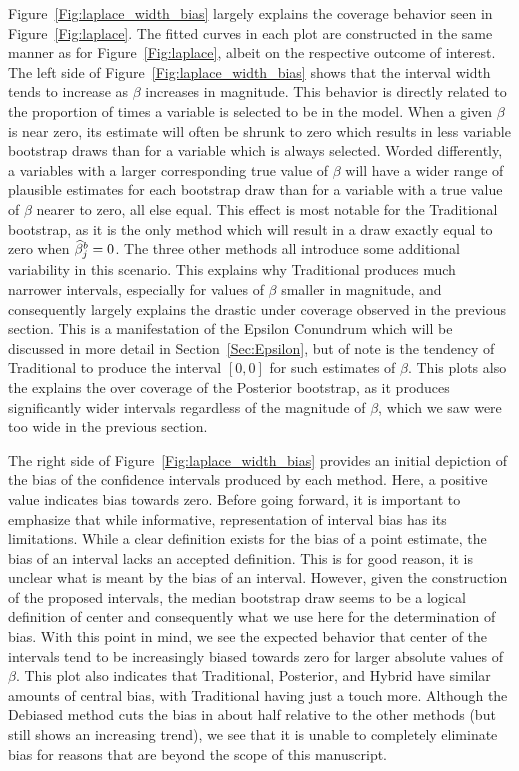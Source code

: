 Figure~\ref{Fig:laplace_width_bias} largely explains the coverage behavior seen in Figure~\ref{Fig:laplace}. The fitted curves in each plot are constructed in the same manner as for Figure~\ref{Fig:laplace}, albeit on the respective outcome of interest. The left side of Figure~\ref{Fig:laplace_width_bias} shows that the interval width tends to increase as $\beta$ increases in magnitude. This behavior is directly related to the proportion of times a variable is selected to be in the model. When a given $\beta$ is near zero, its estimate will often be shrunk to zero which results in less variable bootstrap draws than for a variable which is always selected. Worded differently, a variables with a larger corresponding true value of $\beta$ will have a wider range of plausible estimates for each bootstrap draw than for a variable with a true value of $\beta$ nearer to zero, all else equal. This effect is most notable for the Traditional bootstrap, as it is the only method which will result in a draw exactly equal to zero when $\widehat{\beta}^b_j = 0$. The three other methods all introduce some additional variability in this scenario. This explains why Traditional produces much narrower intervals, especially for values of $\beta$ smaller in magnitude, and consequently largely explains the drastic under coverage observed in the previous section. This is a manifestation of the Epsilon Conundrum which will be discussed in more detail in Section~\ref{Sec:Epsilon}, but of note is the tendency of Traditional to produce the interval $[0,0]$ for such estimates of $\beta$. This plots also the explains the over coverage of the Posterior bootstrap, as it produces significantly wider intervals regardless of the magnitude of $\beta$, which we saw were too wide in the previous section.

The right side of Figure~\ref{Fig:laplace_width_bias} provides an initial depiction of the bias of the confidence intervals produced by each method. Here, a positive value indicates bias towards zero. Before going forward, it is important to emphasize that while informative, representation of interval bias has its limitations. While a clear definition exists for the bias of a point estimate, the bias of an interval lacks an accepted definition. This is for good reason, it is unclear what is meant by the bias of an interval. However, given the construction of the proposed intervals, the median bootstrap draw seems to be a logical definition of center and consequently what we use here for the determination of bias. With this point in mind, we see the expected behavior that center of the intervals tend to be increasingly biased towards zero for larger absolute values of $\beta$. This plot also indicates that Traditional, Posterior, and Hybrid have similar amounts of central bias, with Traditional having just a touch more. Although the Debiased method cuts the bias in about half relative to the other methods (but still shows an increasing trend), we see that it is unable to completely eliminate bias for reasons that are beyond the scope of this manuscript.

